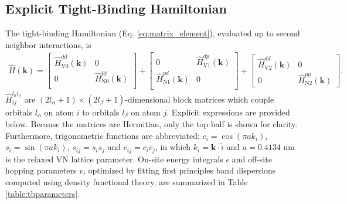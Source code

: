 \documentclass[twocolumn,showpacs,preprintnumbers,superscriptaddress,prb,floatfix,aps,10pt]{revtex4-1}
\renewcommand{\vec}[1]{\ensuremath{\mathbf{#1}}}
\newcommand*{\ham}{\hat{H}}
\begin{document}
\begin{widetext}

\section{Explicit Tight-Binding Hamiltonian}

The tight-binding Hamiltonian (Eq. \ref{eq:matrix_element}), evaluated up to second neighbor interactions, is
%
%
\begin{align}
\label{eq:ham_explicit}
\ham(\vec{k}) =
\begin{bmatrix}
\ham_{\textrm{V}0}^{dd}(\vec{k}) & 0 \\
0 & \ham_{\textrm{N}0}^{pp}(\vec{k})\\
\end{bmatrix}
+ 
\begin{bmatrix}
0 &\ham_{\textrm{V}1}^{dp}(\vec{k}) \\
\ham_{\textrm{N}1}^{pd}(\vec{k}) & 0 \\
\end{bmatrix}
+ 
\begin{bmatrix}
\ham_{\textrm{V}2}^{dd}(\vec{k}) & 0 \\
0 & \ham_{\textrm{N}2}^{pp}(\vec{k})
\end{bmatrix} .
\end{align}
%
%
$\ham_{ij}^{l_\alpha l_\beta}$ are $(2l_\alpha+1)\times(2l_\beta+1)$-dimensional block matrices which couple orbitals $l_\alpha$ on atom $i$ to orbitals $l_\beta$ on atom $j$. Explicit expressions are provided below.  Because the matrices are Hermitian, only the top half is shown for clarity. Furthermore, trigonometric functions are abbreviated: $c_i = \cos(\pi a k_i)$, $s_i = \sin(\pi a k_i)$, $s_{ij} = s_i s_j$ and $c_{ij} = c_i c_j$, in which $k_i = \vec{k}\cdot\hat{i}$ and $a = 0.4134$ nm is the relaxed VN lattice parameter. On-site energy integrals $\epsilon$ and off-site hopping parameters $v$, optimized by fitting first principles band dispersions computed using density functional theory, are summarized in Table \ref{table:tbparameters}.

%



\end{widetext}
\end{document}
